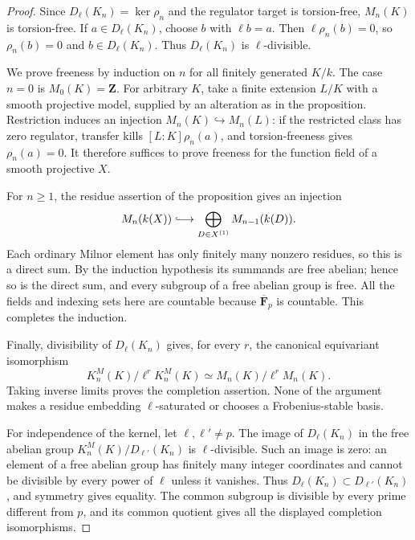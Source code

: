 \begin{proof}
Since $D_\ell(K_n)=\ker\rho_n$ and the regulator target is torsion-free,
$M_n(K)$ is torsion-free.  If $a\in D_\ell(K_n)$, choose $b$ with
$\ell b=a$.  Then $\ell\rho_n(b)=0$, so $\rho_n(b)=0$ and
$b\in D_\ell(K_n)$.  Thus $D_\ell(K_n)$ is $\ell$-divisible.

We prove freeness by induction on $n$ for all finitely generated $K/k$.
The case $n=0$ is $M_0(K)=\mathbf Z$.  For arbitrary $K$, take a finite
extension $L/K$ with a smooth projective model, supplied by an
alteration as in the proposition.  Restriction induces an injection
$M_n(K)\hookrightarrow M_n(L)$: if the restricted class has zero
regulator, transfer kills $[L:K]\rho_n(a)$, and torsion-freeness gives
$\rho_n(a)=0$.  It therefore suffices to prove freeness for the
function field of a smooth projective $X$.

For $n\ge1$, the residue assertion of the proposition gives an injection
\[
 M_n(k(X))\lhook\joinrel\longrightarrow
       \bigoplus_{D\in X^{(1)}}M_{n-1}(k(D)).
\]
Each ordinary Milnor element has only finitely many nonzero residues,
so this is a direct sum.  By the induction hypothesis its summands
are free abelian; hence so is the direct sum, and every subgroup of
a free abelian group is free.  All the fields and indexing sets here
are countable because $\overline{\mathbf F}_p$ is countable.  This
completes the induction.

Finally, divisibility of $D_\ell(K_n)$ gives, for every $r$, the
canonical equivariant isomorphism
\[
 K_n^M(K)/\ell^rK_n^M(K)\simeq M_n(K)/\ell^rM_n(K).
\]
Taking inverse limits proves the completion assertion.  None of the
argument makes a residue embedding $\ell$-saturated or chooses a
Frobenius-stable basis.

For independence of the kernel, let $\ell,\ell'\ne p$.  The image of
$D_\ell(K_n)$ in the free abelian group
$K_n^M(K)/D_{\ell'}(K_n)$ is $\ell$-divisible.  Such an image is zero:
an element of a free abelian group has finitely many integer
coordinates and cannot be divisible by every power of $\ell$ unless
it vanishes.  Thus $D_\ell(K_n)\subset D_{\ell'}(K_n)$, and symmetry
gives equality.  The common subgroup is divisible by every prime
different from $p$, and its common quotient gives all the displayed
completion isomorphisms.
\end{proof}

